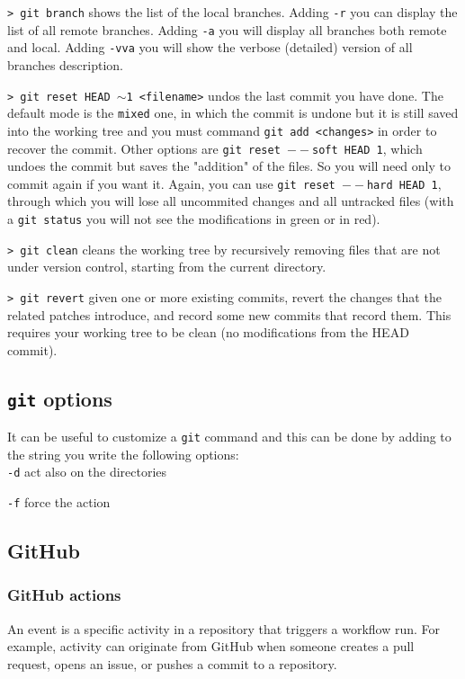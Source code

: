 \documentclass[11pt]{article}
\newcommand{\cmd}[1]{\colorbox{light-gray}{\textcolor{gio}{\texttt{#1}}}}
\begin{document}
\begin{multicols}{2}
\cmd{> git branch} shows the list of the local branches. Adding \texttt{-r} you can display the list of all remote branches. Adding \texttt{-a} you will display all branches both remote and local. Adding \cmd{-vva} you will show the verbose (detailed) version of all branches description.  

\cmd{> git reset HEAD $\sim$1 <filename>} undos the last commit you have done. The default mode is the \texttt{mixed} one, in which the commit is undone but it is still saved into the working tree and you must command \texttt{git add <changes>} in order to recover the commit. Other options are \texttt{git reset $--$soft HEAD~1}, which undoes the commit but saves the "addition" of the files. So you will need only to commit again if you want it. Again, you can use \texttt{git reset $--$hard HEAD~1}, through which you will lose all uncommited changes and all untracked files (with a \texttt{git status} you will not see the modifications in green or in red).

\cmd{> git clean} cleans the working tree by recursively removing files that are not under version control, starting from the current directory.

\cmd{> git revert} given one or more existing commits, revert the changes that the related patches introduce, and record some new commits that record them. This requires your working tree to be clean (no modifications from the HEAD commit).

\subsection{\texttt{git} options}

It can be useful to customize a \texttt{git} command and this can be done by adding to the string you write the following options: \\

\cmd{-d} act also on the directories

\cmd{-f} force the action

\subsection{GitHub}

\subsubsection{GitHub actions}

An event is a specific activity in a repository that triggers a workflow run. For example, activity can originate from GitHub when someone creates a pull request, opens an issue, or pushes a commit to a repository.


\end{multicols}
\end{document}
